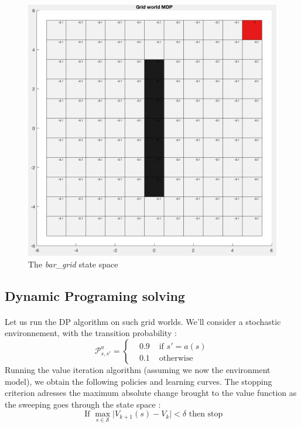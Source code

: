 \documentclass[a4paper]{report}
\begin{document}
{{\begin{figure}[h!]
\begin{minipage}{0.45\linewidth}
					\includegraphics[width=\linewidth]{bar_grid}
					\caption{The \emph{bar\_grid} state space}
				\end{minipage}
			\end{figure}
			\subsection{Dynamic Programing solving}
			{
				\paragraph{} Let us run the DP algorithm on such grid worlds. We'll consider a stochastic environnement, with the transition probability : 
				\begin{equation}
					\mathcal{P}_{s,s'}^a = \left\{\begin{aligned} &0.9 &\text{ if }s' = a(s) \\ &0.1 &\text{ otherwise} \end{aligned}\right.
				\end{equation}
				Running the value iteration algorithm (assuming we now the environment model), we obtain the following policies and learning curves. The stopping criterion adresses the maximum absolute change brought to the value function as the sweeping goes through the state space : 
				\begin{equation}
					\text{ If } \max_{s\in\mathcal{S}} \vert V_{k+1}(s) - V_k \vert < \delta \text{ then stop}
				\end{equation}
				
}}}
\end{document}
